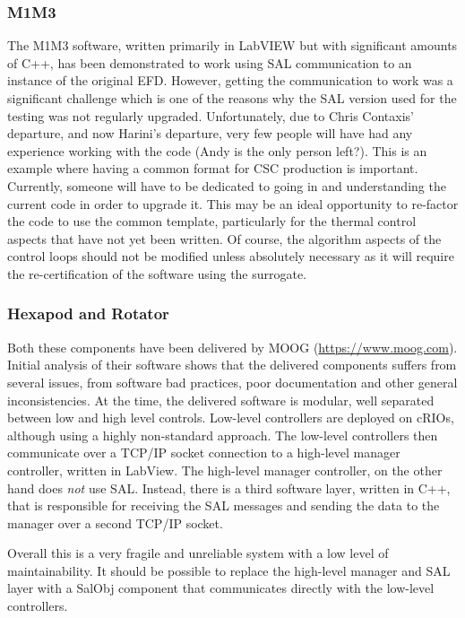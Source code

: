 \documentclass[TS,authoryear,toc]{lsstdoc}
\begin{document}
\subsubsection{M1M3}
The M1M3 software, written primarily in LabVIEW but with significant amounts of C++, has been demonstrated to work using SAL communication to an instance of the original EFD. However, getting the communication to work was a significant challenge which is one of the reasons why the SAL version used for the testing was not regularly upgraded. Unfortunately, due to Chris Contaxis' departure, and now Harini's departure, very few people will have had any experience working with the code (Andy is the only person left?). This is an example where having a common format for CSC production is important. Currently, someone will have to be dedicated to going in and understanding the current code in order to upgrade it. This may be an ideal opportunity to re-factor the code to use the common template, particularly for the thermal control aspects that have not yet been written. Of course, the algorithm aspects of the control loops should not be modified unless absolutely necessary as it will require the re-certification of the software using the surrogate.

\subsubsection{Hexapod and Rotator}
Both these components have been delivered by MOOG (\url{https://www.moog.com}). Initial analysis of their software shows that the delivered components suffers from several issues, from software bad practices, poor documentation and other general inconsistencies. At the time, the delivered software is modular, well separated between low and high level controls. Low-level controllers are deployed on cRIOs, although using a highly non-standard approach. The low-level controllers then communicate over a TCP/IP socket connection to a high-level manager controller, written in LabView. The high-level manager controller, on the other hand does \emph{not} use SAL. Instead, there is a third software layer, written in C++, that is responsible for receiving the SAL messages and sending the data to the manager over a second TCP/IP socket.

Overall this is a very fragile and unreliable system with a low level of maintainability. It should be possible to replace the high-level manager and SAL layer with a SalObj component that communicates directly with the low-level controllers.
\end{document}
